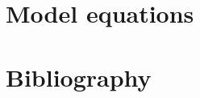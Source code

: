 \documentclass[numbers]{beamer}
\begin{document}
	

	\section{Model equations}
	

	\section{Bibliography}
	
\end{document}
